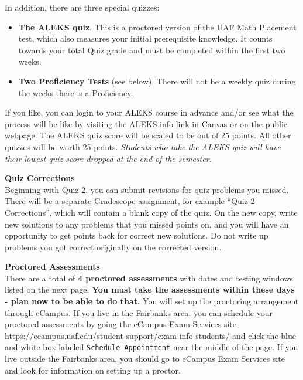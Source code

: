 \documentclass[12pt]{article}
\renewcommand{\emph}[1]{\textsf{\textbf{#1}}}
\newcommand{\localhead}[1]{\par\smallskip\textbf{#1}\nobreak\\}%
\def\heading#1{\localhead{\large\emph{#1}}}
\begin{document}
In addition, there are three special quizzes:
\begin{itemize}
\item \emph{The ALEKS quiz}. This is a proctored version of the UAF Math Placement test, which also measures your initial prerequisite knowledge. It counts towards your total Quiz grade and must be completed within the first two weeks.
\item \emph{Two Proficiency Tests} (see below). There will not be a weekly quiz during the weeks there is a Proficiency.
\end{itemize}

If you like, you can login to your ALEKS course in advance and/or see what the process will be like by visiting the ALEKS info link in Canvas or on the public webpage. The ALEKS quiz score will be scaled to be out of 25 points. All other quizzes will be worth 25 points. \textit{Students who take the ALEKS quiz will have their lowest quiz score dropped at the end of the semester.}


\heading{Quiz Corrections}
Beginning with Quiz 2, you can submit revisions for quiz problems you missed. There will be a separate Gradescope assignment, for example ``Quiz 2 Corrections'', which will contain a blank copy of the quiz. On the new copy, write new solutions to any problems that you missed points on, and you will have an opportunity to get points back for correct new solutions. Do not write up problems you got correct originally on the corrected version.

\heading{Proctored Assessments}
There are a total of \emph{4 proctored assessments} with dates and testing windows listed on the next page. \emph{You must take the assessments within these days - plan now to be able to do that.} You will set up the proctoring arrangement through eCampus. If you live in the Fairbanks area, you can schedule your proctored assessments by going the eCampus Exam Services site \url{ https://ecampus.uaf.edu/student-support/exam-info-students/} and click the blue and white box labeled {\tt{Schedule Appointment}} near the middle of the page. If you live outside the Fairbanks area, you should go to eCampus Exam Services site and look for information on setting up a proctor.

\pagebreak
\end{document}
